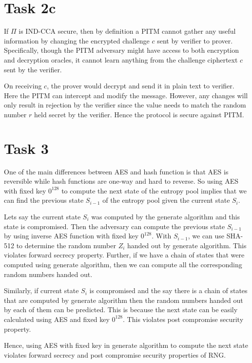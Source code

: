 \documentclass{article}
\begin{document}
    \section*{Task 2c}
    If $\Pi$ is IND-CCA secure, then by definition a PITM cannot gather any useful information by changing the encrypted challenge $c$ sent by verifier to prover. Specifically, though the PITM adversary might have access to both encryption and decryption oracles, it cannot learn anything from the challenge ciphertext $c$ sent by the verifier.

    On receiving $c$, the prover would decrypt and send it in plain text to verifier. Here the PITM can intercept and modify the message. However, any changes will only result in rejection by the verifier since the value needs to match the random number $r$ held secret by the verifier. Hence the protocol is secure against PITM.

    \section*{Task 3}
    One of the main differences between AES and hash function is that AES is reversible while hash functions are one-way and hard to reverse. So using AES with fixed key $0^{128}$ to compute the next state of the entropy pool implies that we can find the previous state $S_{i-1}$ of the entropy pool given the current state $S_i$.

    Lets say the current state $S_i$ was computed by the generate algorithm and this state is compromised. Then the adversary can compute the previous state $S_{i-1}$ by using inverse AES function with fixed key $0^{128}$. With $S_{i-1}$, we can use SHA-512 to determine the random number $Z_i$ handed out by generate algorithm. This violates forward secrecy property. Further, if we have a chain of states that were computed using generate algorithm, then we can compute all the corresponding random numbers handed out.

    Similarly, if current state $S_i$ is compromised and the say there is a chain of states that are computed by generate algorithm then the random numbers handed out by each of them can be predicted. This is because the next state can be easily calculated using AES and fixed key $0^{128}$. This violates post compromise security property.

    Hence, using AES with fixed key in generate algorithm to compute the next state violates forward secrecy and post compromise security properties of RNG.
\end{document}
